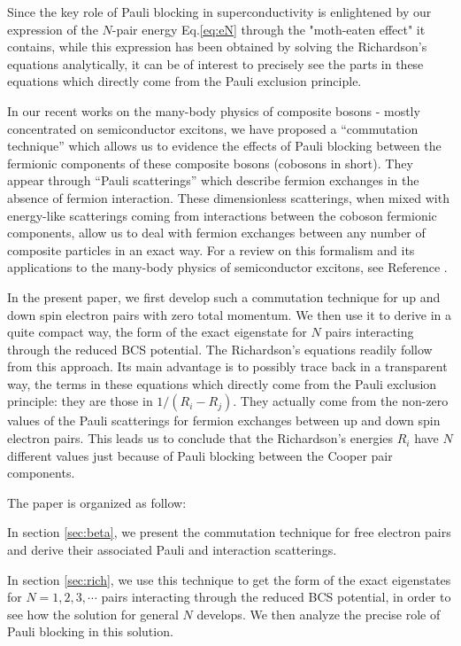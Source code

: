 \documentclass[aps,prb,superscriptaddress,twocolumn]{revtex4}
\begin{document}
Since the key role of Pauli blocking in superconductivity is enlightened by
our expression of the $N$-pair energy Eq.\eqref{eq:eN} through the "moth-eaten effect" it contains, 
while this expression has been obtained by solving the
Richardson's equations analytically, it can be of interest to precisely see the parts in
these equations which directly come from the Pauli exclusion principle.

In our recent works on the many-body physics of composite bosons - mostly concentrated on semiconductor excitons, we have
proposed a ``commutation technique'' which allows us to evidence the effects
of Pauli blocking between the fermionic components of these composite
bosons (cobosons in short). They appear through ``Pauli scatterings'' which describe fermion
exchanges in the absence of fermion interaction. These dimensionless
scatterings, when mixed with energy-like scatterings coming from interactions
between the coboson fermionic components, allow us to deal with fermion exchanges
between any number of composite particles in an exact way. For a review on
this formalism and its applications to the many-body physics of
semiconductor excitons, see Reference \cite%
{CobosonPhysicsReports,CobosonCalculation}.

In the present paper, we first develop such a commutation technique for up and down spin
electron pairs with zero total momentum. We then use it to derive in a quite
compact way, the form of the exact eigenstate for $N$ pairs interacting
through the reduced BCS potential. The Richardson's equations readily follow
from this approach. Its main advantage is to possibly trace back in a
transparent way, the terms in these equations which directly come from the
Pauli exclusion principle: they are those in $1/(R_i-R_j)$. They actually come
from the non-zero values of the Pauli scatterings for fermion exchanges 
between up and down spin electron pairs. This leads us to conclude that 
the Richardson's energies $R_i$  have $N$ different values just because 
of Pauli blocking between the Cooper pair components.

The paper is organized as follow:

In section \ref{sec:beta}, we present the commutation technique for free
electron pairs and derive their associated Pauli and interaction scatterings.

In section \ref{sec:rich}, we use this technique to get the form of the
exact eigenstates for $N=1,2,3,\cdots$ pairs interacting through the reduced
BCS potential, in order to see how the solution for general $N$ develops. We
then analyze the precise role of Pauli blocking in this solution.
\end{document}
